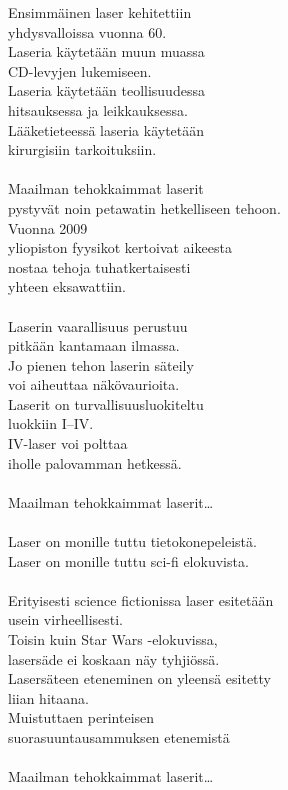 
Ensimmäinen laser kehitettiin\\
yhdysvalloissa vuonna 60.\\
Laseria käytetään muun muassa\\
CD-levyjen lukemiseen.\\
Laseria käytetään teollisuudessa\\
hitsauksessa ja leikkauksessa.\\
Lääketieteessä laseria käytetään\\
kirurgisiin tarkoituksiin.\\
\hspace{10mm}\\
Maailman tehokkaimmat laserit\\
pystyvät noin petawatin hetkelliseen tehoon.\\
Vuonna 2009\\
yliopiston fyysikot kertoivat aikeesta\\
nostaa tehoja tuhatkertaisesti\\
yhteen eksawattiin.\\
\hspace{10mm}\\
Laserin vaarallisuus perustuu\\
pitkään kantamaan ilmassa.\\
Jo pienen tehon laserin säteily\\
voi aiheuttaa näkövaurioita.\\
Laserit on turvallisuusluokiteltu\\
luokkiin I–IV.\\
IV-laser voi polttaa\\
iholle palovamman hetkessä.\\
\hspace{10mm}\\
Maailman tehokkaimmat laserit…\\
\hspace{10mm}\\
Laser on monille tuttu tietokonepeleistä.\\
Laser on monille tuttu sci-fi elokuvista.\\
\hspace{10mm}\\
Erityisesti science fictionissa laser esitetään\\
usein virheellisesti.\\
Toisin kuin Star Wars -elokuvissa,\\
lasersäde ei koskaan näy tyhjiössä.\\
Lasersäteen eteneminen on yleensä esitetty\\
liian hitaana.\\
Muistuttaen perinteisen\\
suorasuuntausammuksen etenemistä\\
\hspace{10mm}\\
Maailman tehokkaimmat laserit…\\